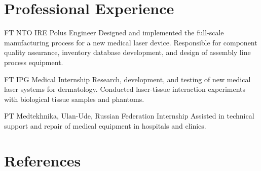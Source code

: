 \documentclass[10pt]{article} %
\begin{document}
\begin{paracol}{2}
\section{Professional Experience}





{FT} %
{NTO IRE Polus} %
{Engineer} %
{Designed and implemented the full-scale manufacturing process for a new medical laser device. Responsible for component quality assurance, inventory database development, and design of assembly line process equipment.} %


{FT} %
{IPG Medical} %
{Internship} %
{Research, development, and testing of new medical laser systems for dermatology. Conducted laser-tissue interaction experiments with biological tissue samples and phantoms.}  %


{PT} %
{Medtekhnika, Ulan-Ude, Russian Federation} %
{Internship} %
{Assisted in technical support and repair of medical equipment in hospitals and clinics.} %


\vspace{-\baselineskip}\medskip %


\section{References}


\end{paracol}
\end{document}
